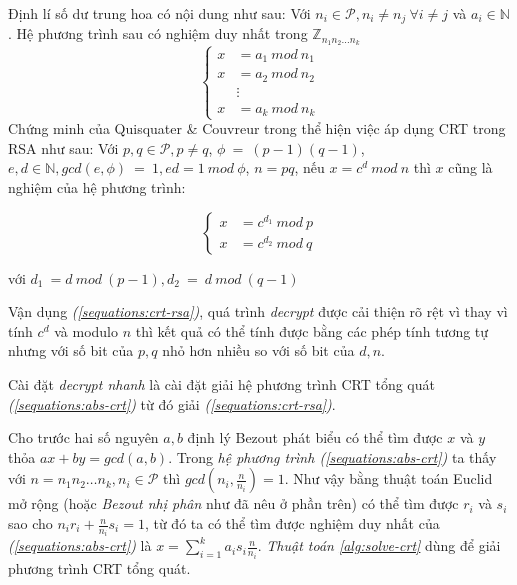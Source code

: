 Định lí số dư trung hoa có nội dung như sau: Với $n_i \in \mathcal{P}, n_i \neq n_j\ \forall i \neq j$ và $a_i \in \mathbb{N}$. Hệ phương trình sau có nghiệm 
duy nhất trong $\mathbb{Z}_{n_1n_2\hdots n_k}$
\begin{equation}\label{sequations:abs-crt}
\begin{cases}
x &= a_1\ mod\ n_1 \\
x &= a_2\ mod\ n_2 \\
& \vdots \\
x &= a_k\ mod\ n_k
\end{cases}
\end{equation}
\cleardoublepage
Chứng minh của Quisquater \& Couvreur trong \cite{Quisquater1982} thể hiện việc áp dụng CRT trong RSA như sau: Với $p, q \in \mathcal{P}, p \neq q$, $\phi\ =\ (p -1)(q-1)$, 
$e,d \in \mathbb{N}, gcd(e,\phi)\ =\ 1, ed = 1\ mod\ \phi$, $n = pq$, nếu $x = c^d\ mod \ n$ thì $x$ cũng là nghiệm của hệ phương trình:

\begin{equation}\label{sequations:crt-rsa}
\begin{cases}
x &= c^{d_1}\ mod\ p \\
x &= c^{d_2}\ mod\ q
\end{cases}
\end{equation}
\begin{center}
với $d_1\ = d\ mod\ (p - 1), d_2\ =\ d\ mod\ (q - 1) $
\end{center}

Vận dụng \textit{(\ref{sequations:crt-rsa})}, quá trình \textit{decrypt} được cải thiện rõ rệt vì thay vì tính $c^d$ và modulo $n$ thì kết quả có thể tính 
được bằng các phép tính tương tự nhưng với số bit của $p, q$ nhỏ hơn nhiều so với số bit của $d, n$.

Cài đặt \textit{decrypt nhanh} là cài đặt giải hệ phương trình CRT tổng quát \textit{(\ref{sequations:abs-crt})} từ đó giải \textit{(\ref{sequations:crt-rsa})}. 

Cho trước hai số nguyên $a,b$ định lý Bezout phát biểu có thể tìm được $x$ và $y$ thỏa $ax + by = gcd(a,b)$. Trong \textit{hệ phương trình 
(\ref{sequations:abs-crt})} ta thấy với $n=n_1n_2\hdots n_k, n_i \in \mathcal{P}$ thì $gcd(n_i,\frac{n}{n_i}) = 1$. Như vậy bằng thuật toán Euclid mở rộng (hoặc \textit{Bezout nhị phân} \cite{giaotrinh} như đã nêu ở phần trên) có thể tìm được 
$r_i$ và $s_i$ sao cho $n_i r_i + \frac{n}{n_i} s_i = 1$, từ đó ta có thể tìm được nghiệm duy nhất của \textit{(\ref{sequations:abs-crt})} là $x = \sum_{i=1}^{k}a_is_i\frac{n}{n_i}$. 
\textit{Thuật toán \ref{alg:solve-crt}} dùng để giải phương trình CRT tổng quát.


